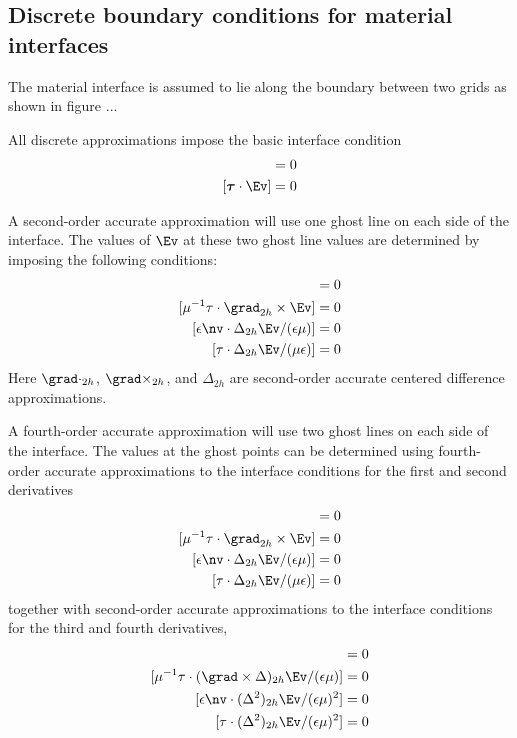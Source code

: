 \subsection{Discrete boundary conditions for material interfaces}


The material interface is assumed to lie along the boundary between two grids
as shown in figure ...


All discrete approximations impose the basic interface condition
\begin{align*}
    [\epsilon \nv\cdot\Ev]&=0 \\
    [\tauv\cdot\Ev]&=0 
\end{align*}




A second-order accurate approximation will use one ghost line on each side of the interface.
The values of $\Ev$ at these two ghost line values are determined by imposing the following
conditions:
\begin{align*}
    [ \grad_{2h}\cdot(\Ev)] & =0 \\
    [ \mu^{-1}\tau\cdot\grad_{2h}\times\Ev] &=0 \\
    [ \epsilon\nv\cdot\Delta_{2h} \Ev/(\epsilon\mu)] & =0 \\
    [ \tau\cdot\Delta_{2h} \Ev/(\mu\epsilon)] &=0 
\end{align*}
Here $\Div_{2h}$, $\curl_{2h}$, and $\Delta_{2h}$ are second-order accurate centered difference
approximations.


A fourth-order accurate approximation will use two ghost lines on each side of the interface.
The values at the ghost points can be determined using fourth-order accurate approximations
to the interface conditions for the first and second derivatives 
\begin{align*}
    [ \grad_{4h}\cdot(\Ev)] & =0 \\
    [ \mu^{-1}\tau\cdot\grad_{2h}\times\Ev] &=0 \\
    [ \epsilon\nv\cdot\Delta_{2h} \Ev/(\epsilon\mu)] & =0 \\
    [ \tau\cdot\Delta_{2h} \Ev/(\mu\epsilon)] &=0 
\end{align*}
together with second-order accurate approximations to the interface conditions for the
third and fourth derivatives,
\begin{align*}
    [ (\Div\Delta)_{2h}(\Ev)] & =0 \\
    [ \mu^{-1} \tau\cdot(\curl\Delta)_{2h}\Ev/(\epsilon\mu)] &=0 \\
    [ \epsilon \nv\cdot(\Delta^2)_{2h} \Ev/(\epsilon\mu)^2 ] & =0 \\
    [ \tau \cdot(\Delta^2)_{2h} \Ev/(\epsilon\mu)^2] &=0 
\end{align*}


